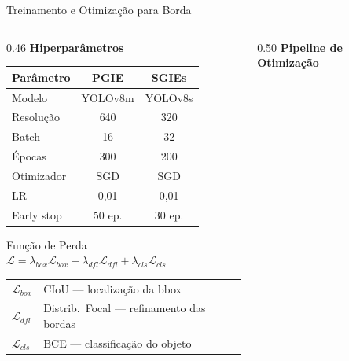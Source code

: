 \begin{frame}{Treinamento e Otimiza\c{c}\~{a}o para Borda}
  \vspace{-2mm}

  \begin{columns}[T]
    \begin{column}{0.46\textwidth}
      {\small\color{inputcolor}\textbf{Hiperpar\^{a}metros}}
      \vspace{1mm}

      \centering
      \scriptsize
      \renewcommand{\arraystretch}{1.15}
      \begin{tabular}{@{}lcc@{}}
        \toprule
        \textbf{Par\^{a}metro} & \textbf{PGIE} & \textbf{SGIEs} \\
        \midrule
        \rowcolor{bgbox}
        Modelo & YOLOv8m & YOLOv8s \\
        Resolu\c{c}\~{a}o & 640 & 320 \\
        \rowcolor{bgbox}
        Batch & 16 & 32 \\
        \'{E}pocas & 300 & 200 \\
        \rowcolor{bgbox}
        Otimizador & SGD & SGD \\
        LR & 0,01 & 0,01 \\
        \rowcolor{bgbox}
        Early stop & 50 ep. & 30 ep. \\
        \bottomrule
      \end{tabular}

      \vspace{2mm}

      \begin{block}{\scriptsize Função de Perda}
        \centering\scriptsize
        $\mathcal{L} = \lambda_{box}\mathcal{L}_{box} + \lambda_{dfl}\mathcal{L}_{dfl} + \lambda_{cls}\mathcal{L}_{cls}$
        \vspace{1mm}

        \raggedright\tiny
        \begin{tabular}{@{}ll@{}}
          $\mathcal{L}_{box}$ & CIoU --- localização da bbox \\
          $\mathcal{L}_{dfl}$ & Distrib.\ Focal --- refinamento das bordas \\
          $\mathcal{L}_{cls}$ & BCE --- classificação do objeto \\
        \end{tabular}
      \end{block}
    \end{column}
    \begin{column}{0.50\textwidth}
      {\small\color{outputcolor}\textbf{Pipeline de Otimiza\c{c}\~{a}o}}
      \vspace{1mm}


\end{column}
\end{columns}
\end{frame}

